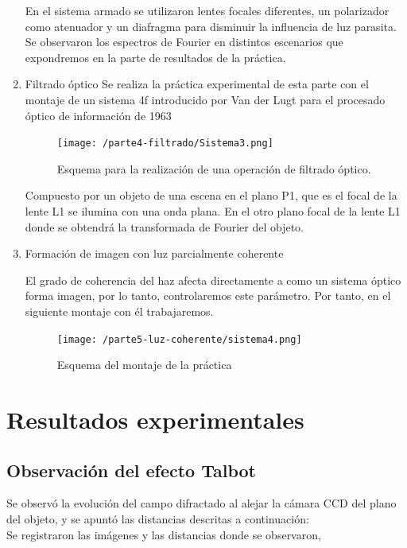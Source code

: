 \documentclass{./packages/optica-article}
\begin{document}
\begin{enumerate}
En el sistema armado se utilizaron lentes focales diferentes, un polarizador como atenuador y un diafragma para disminuir la influencia de luz parasita.\\
Se observaron los espectros de Fourier en distintos escenarios que expondremos en la parte de resultados de la práctica.
    \item Filtrado óptico
Se realiza la práctica experimental de esta parte con el montaje de un sistema 4f introducido por Van der Lugt para el procesado óptico de información de 1963

\begin{figure}[h]
    \centering
    \texttt{[image: /parte4-filtrado/Sistema3.png]}
    \caption{Esquema para la realización de una operación de filtrado óptico.}
    \label{filtradoopticosistema}
    \end{figure}
    
Compuesto por un objeto de una escena en el plano P1, que es el focal de la lente L1 se ilumina con una onda plana. En el otro plano focal de la lente L1 donde se obtendrá la transformada de Fourier del objeto.

    \item Formación de imagen con luz parcialmente coherente

El grado de coherencia del haz afecta directamente a como un sistema óptico forma imagen, por lo tanto, controlaremos este parámetro. Por tanto, en el siguiente montaje con él trabajaremos.

\begin{figure}[h]
    \centering
    \texttt{[image: /parte5-luz-coherente/sistema4.png]}
    \caption{Esquema del montaje de la práctica}
    \label{coherenciaespacial}
    \end{figure}

\end{enumerate}

\section{Resultados experimentales}

\subsection{Observación del efecto Talbot}
Se observó la evolución del campo difractado al alejar la cámara CCD del plano del objeto, y se apuntó las distancias descritas a continuación:\\
Se registraron las imágenes y las distancias donde se observaron, 
\end{document}
